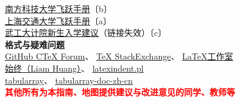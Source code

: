 \begin{table}[H]
\begin{tblr}
{        \uline{\href{https://github.com/SUSTech-Application/SUSTechapplication}{%
        南方科技大学飞跃手册}}〔b〕                                                               \\
        \uline{\href{https://github.com/SurviveSJTU/SJTU-Application}{%
        上海交通大学飞跃手册}}〔a〕                                                               \\
        \uline{\href{https://gitee.com/hanyaner/witjij}{%
        武工大计院新生入学建议}}（链接失效）〔c〕}                                                \\
        {\large\textbf{格式与疑难问题}}                                                           \\
        {
        {\uline{\href{https://github.com/CTeX-org/forum/issues}{GitHub CTeX Forum}}、%
                \uline{\href{https://tex.stackexchange.com}{TeX StackExchange}}、%
        \uline{\href{https://www.latexstudio.net}{LaTeX工作室}}}                                  \\
        {\uline{\href{https://liam.page}{始终（Liam Huang）}}、%
        \uline{\href{https://ctan.org/pkg/latexindent}{latexindent.pl}}}                          \\
        {\uline{\href{https://github.com/lvjr/tabularray}{tabularray}}、%
        \uline{\href{https://gitee.com/nwafu_nan/tabularray-doc-zh-cn}{tabularray-doc-zh-cn}}}
        }                                                                                         \\
        {\large\textbf{\textcolor{red}{其他所有为本指南、地图提供建议与改进意见的同学、教师等}}}
    \end{tblr}  


\end{table}
